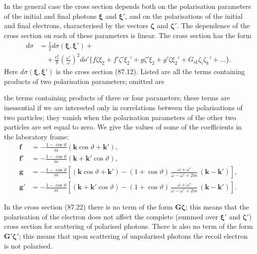 In the general case the cross section depends both on the polarisation parameters of the initial and final photons $\boldsymbol{\xi}$ and $\boldsymbol{\xi}'$, and on the polarisations of the initial and final electrons, characterised by the vectors $\boldsymbol{\zeta}$ and $\boldsymbol{\zeta}'$. The dependence of the cross section on each of these parameters is linear. The cross section has the form
\begin{equation}
\begin{split}
d\sigma &= \frac{1}{2}d\sigma(\boldsymbol{\xi},\boldsymbol{\xi}') + {} \\
&\quad {} + \frac{r_\mathrm{e}^2}{8}\left(\frac{\omega'}{\omega}\right)^{\!2}do'\bigl\{f\zeta\xi_2 + f'\zeta'\xi_2' + g\zeta'\xi_2 + g'\zeta\xi_2' + G_{ik}\zeta_i\zeta_k' + \dots\bigr\}.
\end{split}
\label{eq:87.22}
\end{equation}
Here $d\sigma(\boldsymbol{\xi},\boldsymbol{\xi}')$ is the cross section (87.12). Listed are all the terms containing products of two polarisation parameters; omitted are


the terms containing products of three or four parameters; these terms are inessential if we are interested only in correlations between the polarisations of two particles; they vanish when the polarisation parameters of the other two particles are set equal to zero. We give the values of some of the coefficients in the laboratory frame:
\begin{align*}
\mathbf{f} &= -\frac{1-\cos\vartheta}{m}(\mathbf{k}\cos\vartheta + \mathbf{k}'), \\
\mathbf{f}' &= -\frac{1-\cos\vartheta}{m}(\mathbf{k} + \mathbf{k}'\cos\vartheta), \\
\mathbf{g} &= -\frac{1-\cos\vartheta}{m}\left[(\mathbf{k}\cos\vartheta + \mathbf{k}') - (1+\cos\vartheta)\,\frac{\omega+\omega'}{\omega-\omega'+2m}\,(\mathbf{k}-\mathbf{k}')\right], \\
\mathbf{g}' &= -\frac{1-\cos\vartheta}{m}\left[(\mathbf{k} + \mathbf{k}'\cos\vartheta) - (1+\cos\vartheta)\,\frac{\omega+\omega'}{\omega-\omega'+2m}\,(\mathbf{k}-\mathbf{k}')\right].
\end{align*}
\setcounter{equation}{23}

In the cross section (87.22) there is no term of the form $\mathbf{G}\boldsymbol{\zeta}$; this means that the polarisation of the electron does not affect the complete (summed over $\boldsymbol{\xi}'$ and $\boldsymbol{\zeta}'$) cross section for scattering of polarised photons. There is also no term of the form $\mathbf{G}'\boldsymbol{\zeta}'$; this means that upon scattering of unpolarised photons the recoil electron is not polarised.

